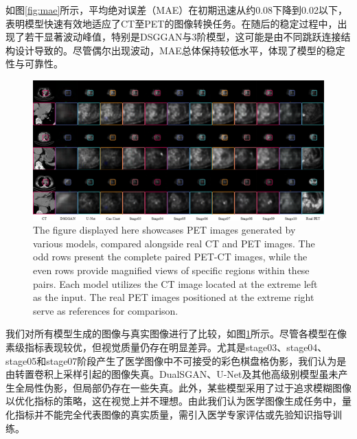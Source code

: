\documentclass[twocolumn]{article}
\begin{document}
如图\ref{fig:mae}所示，平均绝对误差（MAE）在初期迅速从约0.08下降到0.02以下，表明模型快速有效地适应了CT至PET的图像转换任务。在随后的稳定过程中，出现了若干显著波动峰值，特别是DSGGAN与3阶模型，这可能是由不同跳跃连接结构设计导致的。尽管偶尔出现波动，MAE总体保持较低水平，体现了模型的稳定性与可靠性。


\begin{figure}[t!]
	\centering
	\includegraphics[width=1.0\linewidth]{u-net/lung/lung_compare_folder/lung_compare_13.png}
	\caption[lung_compare]{The figure displayed here showcases PET images generated by various models, compared alongside real CT and PET images. The odd rows present the complete paired PET-CT images, while the even rows provide magnified views of specific regions within these pairs. Each model utilizes the CT image located at the extreme left as the input. The real PET images positioned at the extreme right serve as references for comparison. }
	\label{fig:lung_compare}
\end{figure}
我们对所有模型生成的图像与真实图像进行了比较，如图\ref{fig:lung_compare}所示。尽管各模型在像素级指标表现较优，但视觉质量仍存在明显差异。尤其是stage03、stage04、stage05和stage07阶段产生了医学图像中不可接受的彩色棋盘格伪影，我们认为是由转置卷积上采样引起的图像失真。DualSGAN、U-Net及其他高级别模型虽未产生全局性伪影，但局部仍存在一些失真。此外，某些模型采用了过于追求模糊图像以优化指标的策略，这在视觉上并不理想。由此我们认为医学图像生成任务中，量化指标并不能完全代表图像的真实质量，需引入医学专家评估或先验知识指导训练。
\end{document}
